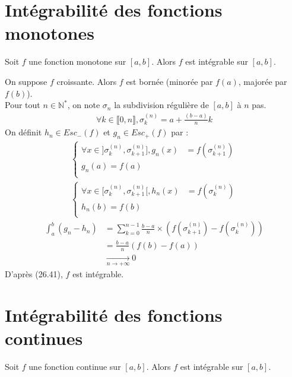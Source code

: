 \documentclass[../main.tex]{subfiles}
\begin{document}
\section{Intégrabilité des fonctions monotones}
\begin{tcolorbox}[title=Théorème 26.42, title filled=false, colframe=orange, colback=orange!10!white]
    Soit $f$ une fonction monotone sur $[a, b]$. Alors $f$ est intégrable sur $[a, b]$. 
\end{tcolorbox}

\noindent On suppose $f$ croissante. Alors $f$ est bornée (minorée par $f(a)$, majorée par $f(b)$). \\
Pour tout $n\in \mathbb{N}^*$, on note $\sigma_n$ la subdivision régulière de $[a, b]$ à $n$ pas. 
\begin{align*}
    \forall k\in \llbracket 0, n \rrbracket, \sigma_k^{(n)} = a + \frac{(b-a)}{n}k
\end{align*}
On définit $h_n \in Esc_-(f)$ et $g_n \in Esc_+(f)$ par :
\begin{align*}
    \begin{cases}
        \forall x\in ]\sigma_k^{(n)}, \sigma_{k+1}^{(n)}], g_n(x) &= f(\sigma_{k+1}^{(n)}) \\
        g_n(a) = f(a) \\
    \end{cases}
     \\
     \begin{cases}
        \forall x\in [\sigma_k^{(n)}, \sigma_{k+1}^{(n)}[, h_n(x) &= f(\sigma_k^{(n)}) \\
        h_n(b) = f(b) \\
     \end{cases}
\end{align*}
\begin{align*}
    \int_{a}^{b} (g_n - h_n) &= \sum_{k=0}^{n-1} \frac{b-a}{n} \times (f(\sigma_{k+1}^{(n)}) - f(\sigma_k^{(n)})) \\
    &= \frac{b-a}{n} (f(b) - f(a)) \\
    &\underset{n \to +\infty}{\longrightarrow} 0
\end{align*}
D'après (26.41), $f$ est intégrable. 

\section{Intégrabilité des fonctions continues}
\begin{tcolorbox}[title=Théorème 26.43, title filled=false, colframe=orange, colback=orange!10!white]
    Soit $f$ une fonction continue sur $[a, b]$. Alors $f$ est intégrable sur $[a, b]$.
\end{tcolorbox}
\end{document}
